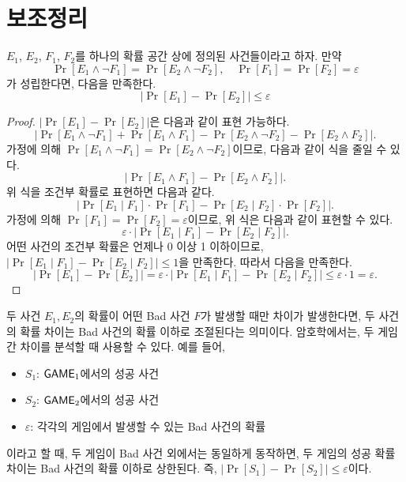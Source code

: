 \section{보조정리}

\begin{tcolorbox}[colback=white]
    \begin{lemma}
        $E_1$, $E_2$, $F_1$, $F_2$를 하나의 확률 공간 상에 정의된 사건들이라고
        하자. 만약
        $$
            \Pr[E_1 \land \neg F_1] = \Pr[E_2 \land \neg F_2], \quad \Pr[F_1] = \Pr[F_2] = \varepsilon
        $$
        가 성립한다면, 다음을 만족한다.
        $$
            |\Pr[E_1] - \Pr[E_2]| \leq \varepsilon
        $$
    \end{lemma}
\end{tcolorbox}

\begin{proof}
    $|\Pr[E_1] - \Pr[E_2]|$은 다음과 같이 표현 가능하다.
    $$
        |\Pr[E_1 \land \neg F_1] + \Pr[E_1 \land F_1] - \Pr[E_2 \land \neg F_2] - \Pr[E_2 \land F_2]|.
    $$
    가정에 의해 $\Pr[E_1 \land \neg F_1] = \Pr[E_2 \land \neg F_2]$이므로, 다음과 같이 식을 줄일 수 있다.
    $$
        |\Pr[E_1 \land F_1] - \Pr[E_2 \land F_2]|.
    $$
    위 식을 조건부 확률로 표현하면 다음과 같다.
    $$
        |\Pr[E_1 \mid F_1] \cdot \Pr[F_1] - \Pr[E_2 \mid F_2] \cdot \Pr[F_2]|.
    $$
    가정에 의해 $\Pr[F_1] = \Pr[F_2] = \varepsilon$이므로, 위 식은 다음과 같이
    표현할 수 있다.
    $$
    \varepsilon \cdot |\Pr[E_1 \mid F_1]- \Pr[E_2 \mid F_2]|.
    $$
    어떤 사건의 조건부 확률은 언제나 0 이상 1 이하이므로, $|\Pr[E_1 \mid F_1] -
    \Pr[E_2 \mid F_2]| \leq 1$을 만족한다. 따라서 다음을 만족한다.
    $$
    |\Pr[E_1] - \Pr[E_2]| = \varepsilon \cdot |\Pr[E_1 \mid F_1] - \Pr[E_2 \mid F_2]| \leq \varepsilon \cdot 1 = \varepsilon.
    $$
\end{proof}

\begin{memo}
    두 사건 $E_1, E_2$의 확률이 어떤 Bad 사건 $F$가 발생할 때만 차이가
    발생한다면, 두 사건의 확률 차이는 Bad 사건의 확률 이하로 조절된다는
    의미이다. 암호학에서는, 두 게임 간 차이를 분석할 때 사용할 수 있다. 예를 들어, 
    \begin{itemize}
        \item $S_1$: $\textsf{GAME}_1$에서의 성공 사건
        \item $S_2$: $\textsf{GAME}_2$에서의 성공 사건
        \item $\varepsilon$: 각각의 게임에서 발생할 수 있는 Bad 사건의 확률
    \end{itemize}
    이라고 할 때, 두 게임이 Bad 사건 외에서는 동일하게 동작하면, 두 게임의 성공
    확률 차이는 Bad 사건의 확률 이하로 상한된다. 즉, $|\Pr[S_1] - \Pr[S_2]| \leq \varepsilon$이다.
\end{memo}